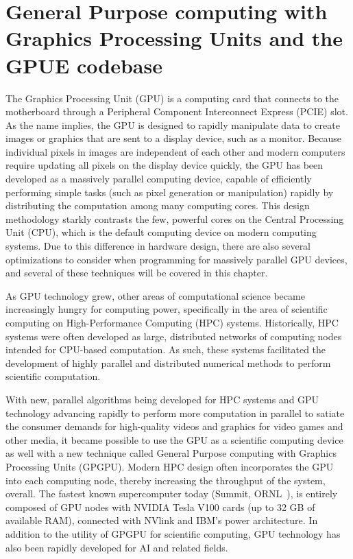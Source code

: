 \chapter{General Purpose computing with Graphics Processing Units and the GPUE codebase}
\label{ch:gpu}

The Graphics Processing Unit (GPU) is a computing card that connects to the motherboard through a Peripheral Component Interconnect Express (PCIE) slot.
As the name implies, the GPU is designed to rapidly manipulate data to create images or graphics that are sent to a display device, such as a monitor.
Because individual pixels in images are independent of each other and modern computers require updating all pixels on the display device quickly, the GPU has been developed as a massively parallel computing device, capable of efficiently performing simple tasks (such as pixel generation or manipulation) rapidly by distributing the computation among many computing cores.
This design methodology starkly contrasts the few, powerful cores on the Central Processing Unit (CPU), which is the default computing device on modern computing systems.
Due to this difference in hardware design, there are also several optimizations to consider when programming for massively parallel GPU devices, and several of these techniques will be covered in this chapter.

As GPU technology grew, other areas of computational science became increasingly hungry for computing power, specifically in the area of scientific computing on High-Performance Computing (HPC) systems.
Historically, HPC systems were often developed as large, distributed networks of computing nodes intended for CPU-based computation.
As such, these systems facilitated the development of highly parallel and distributed numerical methods to perform scientific computation.

With new, parallel algorithms being developed for HPC systems and GPU technology advancing rapidly to perform more computation in parallel to satiate the consumer demands for high-quality videos and graphics for video games and other media, it became possible to use the GPU as a scientific computing device as well with a new technique called General Purpose computing with Graphics Processing Units (GPGPU).
Modern HPC design often incorporates the GPU into each computing node, thereby increasing the throughput of the system, overall.
The fastest known supercomputer today (Summit, ORNL~\cite{kahle2019}), is entirely composed of GPU nodes with NVIDIA Tesla V100 cards (up to 32 GB of available RAM), connected with NVlink and IBM's power architecture.
In addition to the utility of GPGPU for scientific computing, GPU technology has also been rapidly developed for AI and related fields.

